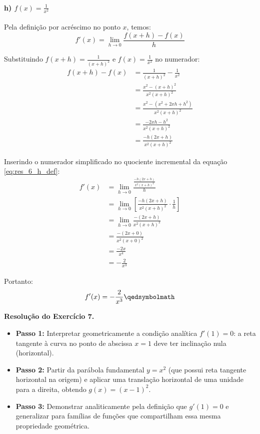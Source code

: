 \setcounter{equation}{0}
\paragraph{h) $f(x) = \frac{1}{x^2}$}

Pela definição por acréscimo no ponto $x$, temos:
\begin{equation}
f'(x) = \lim_{h \to 0} \frac{f(x + h) - f(x)}{h} \label{eq:res_6_h_def}
\end{equation}

Substituindo $f(x + h) = \frac{1}{(x + h)^2}$ e $f(x) = \frac{1}{x^2}$ no numerador:
\begin{align*}
f(x + h) - f(x) &= \frac{1}{(x + h)^2} - \frac{1}{x^2} \\
&= \frac{x^2 - (x + h)^2}{x^2(x + h)^2} \\
&= \frac{x^2 - (x^2 + 2xh + h^2)}{x^2(x + h)^2} \\
&= \frac{-2xh - h^2}{x^2(x + h)^2} \\
&= \frac{-h(2x + h)}{x^2(x + h)^2}
\end{align*}

Inserindo o numerador simplificado no quociente incremental da equação \eqref{eq:res_6_h_def}:
\begin{align*}
f'(x) &= \lim_{h \to 0} \frac{\frac{-h(2x + h)}{x^2(x + h)^2}}{h} \\
      &= \lim_{h \to 0} \left[ \frac{-h(2x + h)}{x^2(x + h)^2} \cdot \frac{1}{h} \right] \\
      &= \lim_{h \to 0} \frac{-(2x + h)}{x^2(x + h)^2} \\
      &= \frac{-(2x + 0)}{x^2(x + 0)^2} \\
      &= \frac{-2x}{x^4} \\
      &= -\frac{2}{x^3}
\end{align*}

Portanto:
\[
  f'(x) = -\frac{2}{x^3} \qedsymbolmath
\]

\vspace{0.6cm}
\noindent\textbf{Resolução do Exercício 7.}
\label{res:7.2.7}
\setcounter{equation}{0}

\begin{estrategiabox}[title=Estratégia Geral de Resolução]
  \begin{itemize}[noitemsep, topsep=2pt]
    \item \textbf{Passo 1:} Interpretar geometricamente a condição analítica $f'(1) = 0$: a reta tangente à curva no ponto de abscissa $x = 1$ deve ter inclinação nula (horizontal).
    \item \textbf{Passo 2:} Partir da parábola fundamental $y = x^2$ (que possui reta tangente horizontal na origem) e aplicar uma translação horizontal de uma unidade para a direita, obtendo $g(x) = (x - 1)^2$.
    \item \textbf{Passo 3:} Demonstrar analiticamente pela definição que $g'(1) = 0$ e generalizar para famílias de funções que compartilham essa mesma propriedade geométrica.
  \end{itemize}
\end{estrategiabox}

